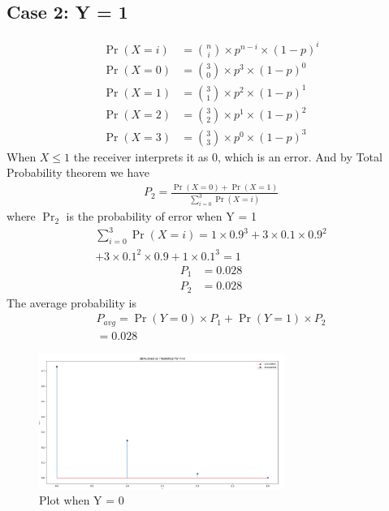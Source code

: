 \documentclass[journal,12pt,twocolumn]{IEEEtran}
\begin{document}
\subsection*{Case 2: Y = 1}
\begin{align}
\Pr(X = i) &= \binom{n}{i}\times p^{n-i}\times (1-p)^i\\
\Pr(X = 0) &= \binom{3}{0}\times p^3\times (1-p)^{0}\\
\Pr(X = 1) &= \binom{3}{1}\times p^2\times (1-p)^{1}\\
\Pr(X = 2) &= \binom{3}{2}\times p^1\times (1-p)^{2}\\
\Pr(X = 3) &= \binom{3}{3}\times p^0\times (1-p)^{3}
\end{align}
When $X \leq 1 $ the receiver interprets it as 0, which is an error. And by Total Probability theorem we have
\begin{align}
P_2 = \frac{\Pr(X = 0) + \Pr(X = 1)}{\sum_{i=0}^3\Pr(X = i)}
\end{align}
where $\Pr_2$ is the probability of error when Y = 1
\begin{multline}
\sum_{i=0}^3\Pr(X = i) = 1\times 0.9^3 + 3\times 0.1\times 0.9^2 \\
+ 3\times 0.1^2 \times 0.9 + 1\times 0.1^3 = 1
\end{multline}
\begin{align}
P_1 &= 0.028\\
P_2 &= 0.028
\end{align}
The average probability is 
\begin{multline}
P_{avg} = \Pr(Y = 0)\times P_1 +\Pr(Y = 1)\times P_2\\ = 0.028 \end{multline}
\begin{table}[H]
\centering
{}
\caption{Probability of number of 1's recieved  }
\label{table:1}
\end{table}
\begin{figure}[htp]
    \centering
    \includegraphics[width=8cm]{assignment2_plot1}
    \caption{Plot when Y = 0}
    \label{fig:1}
\end{figure}
\end{document}
